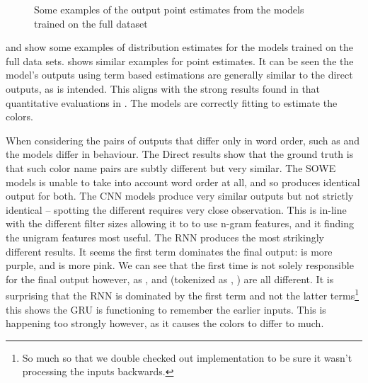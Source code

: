 \documentclass[11pt,a4paper]{article}
\begin{document}
\begin{figure}
	\caption{Some examples of the output point estimates from the models trained on the full dataset} \label{fig:pointout}
\end{figure}

 and  show some examples of distribution estimates for the models trained on the full data sets.
 shows similar examples for point estimates.
It can be seen the the model's outputs using term based estimations are generally similar to the direct outputs, as is intended.
This aligns with the strong results found in that quantitative evaluations in .
The models are correctly fitting to estimate the colors.

When considering the pairs of outputs that differ only in word order, such as  and  the models differ in behaviour.
The Direct results show that the ground truth is that such color name pairs are subtly different but very similar.
The SOWE models is unable to take into account word order at all, and so produces identical output for both.
The CNN models produce very similar outputs but not strictly identical -- spotting the different requires very close observation.
This is in-line with the different filter sizes allowing it to to use n-gram features, and it finding the unigram features most useful.
The RNN produces the most strikingly different results.
It seems the first term dominates the final output:  is more purple, and   is more pink.
We can see that the first time is not solely responsible for the final output however, as ,  and  (tokenized as , ) are all different.
It is surprising that the RNN is dominated by the first term and not the latter terms\footnote{So much so that we double checked out implementation to be sure it wasn't processing the inputs backwards.} this shows the GRU is functioning to remember the earlier inputs.
This is happening too strongly however, as it causes the colors to differ to much.
\end{document}
